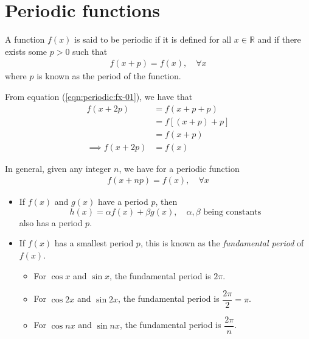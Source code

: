 \section{Periodic functions}
    A function $f(x)$ is said to be periodic if it is defined for all $x\in\mathbb{R}$ and if there exists some $p>0$ such that
    \begin{align}
        f(x+p)=f(x),\quad\forall x \label{eqn:periodic:fx-01}
    \end{align}
    where $p$ is known as the period of the function.

    From equation (\ref{eqn:periodic:fx-01}), we have that
    \begin{align*}
        f(x+2p)&=f(x+p+p) \\
            &=f[(x+p)+p] \\
            &=f(x+p) \\
        \implies f(x+2p)&=f(x)
    \end{align*}

    In general, given any integer $n$, we have for a periodic function
    \begin{align*}
        f(x+np)=f(x),\quad\forall x
    \end{align*}

    \begin{itemize}
        \item If $f(x)$ and $g(x)$ have a period $p$, then
        $$h(x)=\alpha f(x)+\beta g(x),\quad\alpha,\beta\text{ being constants}$$
        also has a period $p$.

        \item If $f(x)$ has a smallest period $p$, this is known as the \textit{fundamental period} of $f(x)$.
        \begin{itemize}
            \item For $\cos{x}$ and $\sin{x}$, the fundamental period is $2\pi$.
            \item For $\cos{2x}$ and $\sin{2x}$, the fundamental period is $\dfrac{2\pi}{2}=\pi$.
            \item For $\cos{nx}$ and $\sin{nx}$, the fundamental period is $\dfrac{2\pi}{n}$.
        \end{itemize}
    \end{itemize}

